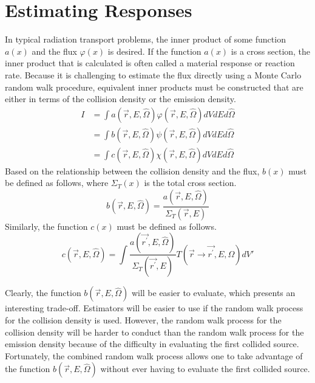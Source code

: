 \section{Estimating Responses}
In typical radiation transport problems, the inner product of some 
function $a(x)$ and the flux $\varphi(x)$ is desired. If the function $a(x)$ is
a cross section, the inner product that is calculated is often called a 
material response or reaction rate. Because it is challenging to estimate the
flux directly using a Monte Carlo random walk procedure, equivalent inner 
products must be constructed that are either in terms of the collision density 
or the emission density. 
\begin{align}
  I & = \int a(\vec{r},E,\hat{\Omega}) \varphi(\vec{r},E,\hat{\Omega}) 
  dVdEd\hat{\Omega} \\
  & = \int b(\vec{r},E,\hat{\Omega}) \psi(\vec{r},E,\hat{\Omega})  
  dVdEd\hat{\Omega} \\
  & = \int c(\vec{r},E,\hat{\Omega}) \chi(\vec{r},E,\hat{\Omega}) 
  dVdEd\hat{\Omega}
\end{align}
Based on the relationship between the collision density and the flux, $b(x)$
must be defined as follows, where $\Sigma_T(x)$ is the total cross section.
\begin{equation}
  b(\vec{r},E,\hat{\Omega}) = \frac{a(\vec{r},E,\hat{\Omega})}
  {\Sigma_T(\vec{r},E)}
  \label{eq:collision_response_function}
\end{equation}
Similarly, the function $c(x)$ must be defined as follows.
\begin{equation}
  c(\vec{r},E,\hat{\Omega}) = \int \frac{a(\vec{r^{'}},E,\hat{\Omega})}
  {\Sigma_T(\vec{r^{'}},E)} T(\vec{r} \to \vec{r^{'}},E,\Omega)dV'
  \label{eq:emission_response_function}
\end{equation}

Clearly, the function $b(\vec{r},E,\hat{\Omega})$ will be easier to evaluate, 
which presents an interesting trade-off. Estimators will be easier to use if 
the random walk process for the collision density is used. However, the random 
walk process for the collision density will be harder to conduct than the 
random walk process for the emission density because of the difficulty in 
evaluating the first collided source. Fortunately, the combined random walk 
process allows one to take advantage of the function 
$b(\vec{r},E,\hat{\Omega})$ without ever having to evaluate the first collided 
source. 

